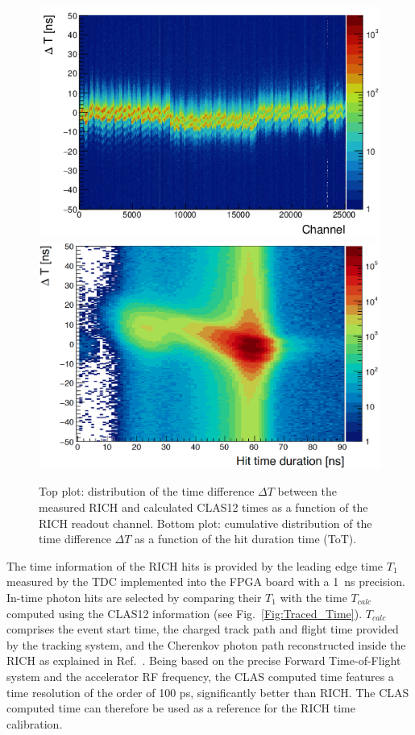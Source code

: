 \documentclass[5p,times,twocolumn]{elsarticle}
\begin{document}
\begin{figure}[t]
\begin{center}
\includegraphics[width=0.85\columnwidth]{dt_vs_anode_nocor.png}
\includegraphics[width=0.85\columnwidth]{dt_vs_dur_nocor.png}
\end{center}
\caption{Top plot: distribution of the time difference $\Delta T$ between the measured RICH and calculated CLAS12
  times as a function of the RICH readout channel. Bottom plot: cumulative distribution of the time difference
  $\Delta T$ as a function of the hit duration time (ToT).}
\label{fig:Time_uncorr}
\end{figure}
The time information of the RICH hits is provided by the leading edge time $T_1$ measured by the TDC implemented
into the FPGA board with a 1~ns precision. In-time photon hits are selected by comparing their $T_1$ with the time
$T_{calc}$ computed using the CLAS12 information (see Fig.~\ref{Fig:Traced_Time}). $T_{calc}$ comprises the event
start time, the charged track path and flight time provided by the tracking system, and the Cherenkov photon path
reconstructed inside the RICH as explained in Ref.~\cite{recon-nim}. Being based on the precise Forward Time-of-Flight
system and the accelerator RF frequency, the CLAS computed time features a time resolution of the order of 100 ps,
significantly better than RICH. The CLAS computed time can therefore be used as a reference for the RICH time calibration.
\end{document}
